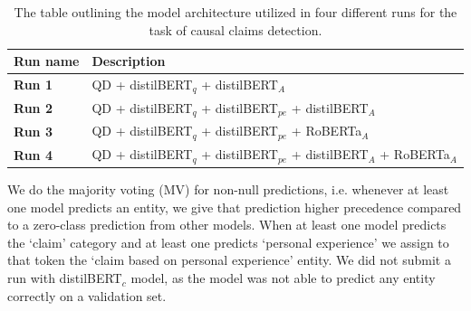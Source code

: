 \documentclass[11pt]{article}
\begin{document}
\begin{table}[h]
    \centering
    \begin{tabular}{lp{5cm}}
    \toprule
   Run name & Description \\ \midrule
       \textbf{Run 1}  & QD + distilBERT$_q$ + distilBERT$_A$ \\
       \textbf{Run 2}  & QD + distilBERT$_q$ + distilBERT$_{pe}$ + distilBERT$_A$ \\
        \textbf{Run 3} & QD + distilBERT$_q$ + distilBERT$_{pe}$ + RoBERTa$_A$ \\
        \textbf{Run 4} & QD + distilBERT$_q$ + distilBERT$_{pe}$ + distilBERT$_A$ + RoBERTa$_A$ \\
         \bottomrule
    \end{tabular}
    \caption{The table outlining the model architecture utilized in four different runs for the task of causal claims detection.}
    \label{tab:runs_task1}
\end{table}

We do the majority voting (MV) for non-null predictions, i.e. whenever at least one model predicts an entity, we give that prediction higher precedence compared to a zero-class prediction from other models.
When at least one model predicts the `claim’ category and at least one predicts `personal experience’ we assign to that token the `claim based on personal experience’ entity.
We did not submit a run with distilBERT$_c$ model, as the model was not able to predict any entity correctly on a validation set.
%
%
%
\end{document}

